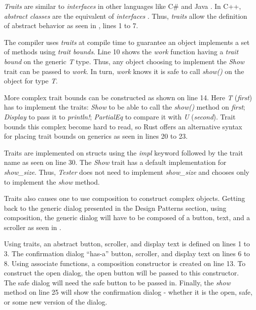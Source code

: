 \textit{Traits} are similar \cite{klabnik_2019_01} to \textit{interfaces} in other languages like C\# \cite{robinson_04_01} and Java \cite{gosling_96_01}.
In C++, \textit{abstract classes} are the equivalent of \textit{interfaces} \cite{malik_09_01,stroustrup_13_01,alexandrescu_01_01}.
Thus, \textit{traits} allow the definition of abstract behavior as seen in , lines 1 to 7.


The compiler uses \textit{traits} at compile time to guarantee an object implements a set of methods using \textit{trait bounds}.
Line 10 shows the \textit{work} function having a \textit{trait bound} on the generic \textit{T} type.
Thus, any object choosing to implement the \textit{Show} trait can be passed to \textit{work}.
In turn, \textit{work} knows it is safe to call \textit{show()} on the object for type \textit{T}.

More complex trait bounds can be constructed as shown on line 14.
Here \textit{T} (\textit{first}) has to implement the traits: \textit{Show} to be able to call the \textit{show()} method on \textit{first}; \textit{Display} to pass it to \textit{println!}; \textit{PartialEq} to compare it with \textit{U} (\textit{second}).
Trait bounds this complex become hard to read, so Rust offers an alternative syntax for placing trait bounds on generics as seen in lines 20 to 23.

Traits are implemented on structs using the \textit{impl} keyword followed by the trait name as seen on line 30.
The \textit{Show} trait has a default implementation for \textit{show\_size}.
Thus, \textit{Tester} does not need to implement \textit{show\_size} and chooses only to implement the \textit{show} method.

Traits also causes one to use composition to construct complex objects.
Getting back to the generic dialog presented in the Design Patterns section, using composition, the generic dialog will have to be composed of a button, text, and a scroller as seen in .


Using traits, an abstract button, scroller, and display text is defined on lines 1 to 3.
The confirmation dialog ``has-a'' \cite{malik_09_01} button, scroller, and display text on lines 6 to 8.
Using associate functions\footnotemark[\ref{associate}], a composition constructor is created on line 13.
To construct the open dialog, the open button will be passed to this constructor.
The safe dialog will need the safe button to be passed in.
Finally, the \textit{show} method on line 25 will show the confirmation dialog - whether it is the open, safe, or some new version of the dialog.

